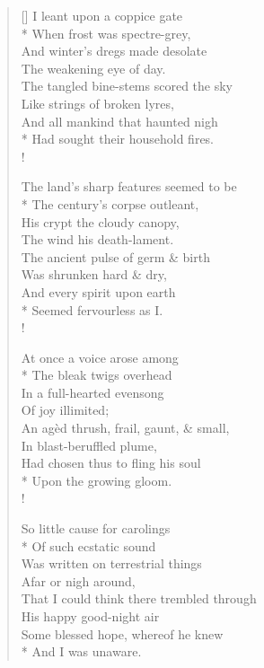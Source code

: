 \documentclass[MAIN]{subfiles}
\begin{document}
\settowidth{\versewidth}{The tangled bine-stems scored the sky}
\begin{verse}[\versewidth]
I leant upon a coppice gate\\*
\vin When frost was spectre-grey,\\
And winter's dregs made desolate\\
\vin The weakening eye of day.\\
The tangled bine-stems scored the sky\\
\vin Like strings of broken lyres,\\
And all mankind that haunted nigh\\*
\vin Had sought their household fires.\\!

The land's sharp features seemed to be\\*
\vin The century's corpse outleant,\\
His crypt the cloudy canopy,\\
\vin The wind his death-lament.\\
The ancient pulse of germ \& birth\\
\vin Was shrunken hard \& dry,\\
And every spirit upon earth\\*
\vin Seemed fervourless as I.\\!

At once a voice arose among\\*
\vin The bleak twigs overhead\\
In a full-hearted evensong\\
\vin Of joy illimited;\\
An ag\`ed thrush, frail, gaunt, \& small,\\
\vin In blast-beruffled plume,\\ 
Had chosen thus to fling his soul\\*
\vin Upon the growing gloom.\\!

So little cause for carolings\\*
\vin Of such ecstatic sound\\
Was written on terrestrial things\\
\vin Afar or nigh around,\\
That I could think there trembled through\\
\vin His happy good-night air\\
Some blessed hope, whereof he knew\\*
\vin And I was unaware.
\end{verse}
\end{document}
